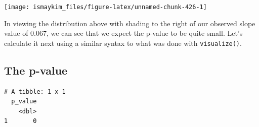 \documentclass[12pt,]{krantz}
\makeatletter
\newenvironment{Shaded}{\begin{snugshade}}{\end{snugshade}}
\newcommand{\KeywordTok}[1]{\textcolor[rgb]{0.27,0.27,0.27}{\textbf{#1}}}
\newcommand{\DataTypeTok}[1]{\textcolor[rgb]{0.27,0.27,0.27}{#1}}
\newcommand{\DecValTok}[1]{\textcolor[rgb]{0.06,0.06,0.06}{#1}}
\newcommand{\StringTok}[1]{\textcolor[rgb]{0.5,0.5,0.5}{#1}}
\newcommand{\OperatorTok}[1]{\textcolor[rgb]{0.43,0.43,0.43}{\textbf{#1}}}
\newcommand{\NormalTok}[1]{#1}
\newenvironment{kframe}{%
\medskip{}
\setlength{\fboxsep}{.8em}
 \def\at@end@of@kframe{}%
 \ifinner\ifhmode%
  \def\at@end@of@kframe{\end{minipage}}%
  \begin{minipage}{\columnwidth}%
 \fi\fi%
 \def\FrameCommand##1{\hskip\@totalleftmargin \hskip-\fboxsep
 \colorbox{shadecolor}{##1}\hskip-\fboxsep
     \hskip-\linewidth \hskip-\@totalleftmargin \hskip\columnwidth}%
 \MakeFramed {\advance\hsize-\width
   \@totalleftmargin\z@ \linewidth\hsize
   \@setminipage}}%
 {\par\unskip\endMakeFramed%
 \at@end@of@kframe}
\renewenvironment{Shaded}{\begin{kframe}}{\end{kframe}}
\makeatother
\begin{document}
\begin{Shaded}
\end{Shaded}

\begin{Shaded}
\end{Shaded}

\begin{center}\texttt{[image: ismaykim\_files/figure-latex/unnamed-chunk-426-1]} \end{center}

In viewing the distribution above with shading to the right of our
observed slope value of 0.067, we can see that we expect the p-value to
be quite small. Let's calculate it next using a similar syntax to what
was done with \texttt{visualize()}.

\subsection{The p-value}\label{the-p-value-1}

\begin{Shaded}
\end{Shaded}

\begin{verbatim}
# A tibble: 1 x 1
  p_value
    <dbl>
1       0
\end{verbatim}
\end{document}
